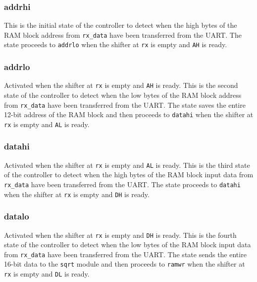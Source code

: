\documentclass[paper=usletter, fontsize=12pt]{article}
\begin{document}
            \subsubsection{addrhi} This is the initial state of the controller
            to detect when the high bytes of the RAM block address from
            \texttt{rx\_data} have been transferred from the UART. The state
            proceeds to \texttt{addrlo} when the shifter at \texttt{rx} is
            empty and \texttt{AH} is ready.

            \subsubsection{addrlo} Activated when the shifter at \texttt{rx} is
            empty and \texttt{AH} is ready. This is the second state of the
            controller to detect when the low bytes of the RAM block address
            from \texttt{rx\_data} have been transferred from the UART. The
            state saves the entire 12-bit address of the RAM block and then
            proceeds to \texttt{datahi} when the shifter at \texttt{rx} is
            empty and \texttt{AL} is ready.

            \subsubsection{datahi} Activated when the shifter at \texttt{rx} is
            empty and \texttt{AL} is ready. This is the third state of the
            controller to detect when the high bytes of the RAM block input
            data from \texttt{rx\_data} have been transferred from the UART.
            The state proceeds to \texttt{datahi} when the shifter at
            \texttt{rx} is empty and \texttt{DH} is ready.

            \subsubsection{datalo} Activated when the shifter at \texttt{rx} is
            empty and \texttt{DH} is ready. This is the fourth state of the
            controller to detect when the low bytes of the RAM block input data
            from \texttt{rx\_data} have been transferred from the UART. The
            state sends the entire 16-bit data to the \texttt{sqrt} module and
            then proceeds to \texttt{ramwr} when the shifter at \texttt{rx} is
            empty and \texttt{DL} is ready.
\end{document}
